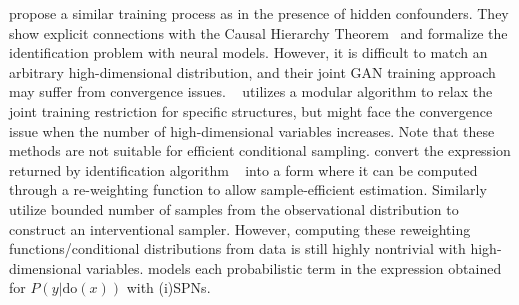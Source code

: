 \documentclass{article}
\newcommand{\Do}{\text{do}}
\theoremstyle{plain}
\theoremstyle{definition}
\theoremstyle{remark}
\begin{document}
\citet{xia2021causal}
propose a similar training process as \citet{kocaoglu2018causalgan}  in the presence of hidden confounders. They show explicit connections with the Causal Hierarchy Theorem~\citep{bareinboim2022pearl} and formalize the identification problem with neural models.
However, it is difficult to match an arbitrary high-dimensional distribution, and
their joint GAN training approach may suffer from convergence issues.
~\citet{rahman2024modular} utilizes a modular algorithm to relax the joint training restriction for specific structures, but might face the convergence issue
when the number of high-dimensional variables increases.
Note that these methods are not suitable for efficient conditional sampling.
%
%
 \citet{jung2020learning} convert the expression returned by identification algorithm ~\citep{tian2002general} into a form where it can be computed through a re-weighting function to allow sample-efficient estimation.
Similarly \citet{bhattacharyya2020learning, bhattacharyya2022efficient} utilize bounded number of samples from the observational distribution to construct an interventional sampler.
 However, computing these reweighting functions/conditional distributions from data is still highly nontrivial with high-dimensional variables. 
\citet{zevcevic2021interventional} models each probabilistic term in the expression obtained for $P(y|\Do(x))$ with (i)SPNs.
\end{document}
